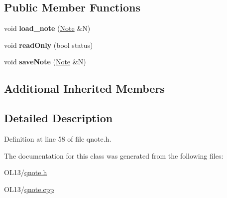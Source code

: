 \subsection*{Public Member Functions}
\begin{DoxyCompactItemize}
\item 
\mbox{\label{class_q_task_a548fc51beaa1dcea345c362782aa11c0}} 
void {\bfseries load\+\_\+note} (\hyperlink{class_note}{Note} \&N)
\item 
\mbox{\label{class_q_task_a1bf9080c14e7a94094bde3fa315d66d9}} 
void {\bfseries read\+Only} (bool status)
\item 
\mbox{\label{class_q_task_ae304b097cdfd1169d2b190bbad3922eb}} 
void {\bfseries save\+Note} (\hyperlink{class_note}{Note} \&N)
\end{DoxyCompactItemize}
\subsection*{Additional Inherited Members}


\subsection{Detailed Description}


Definition at line 58 of file qnote.\+h.



The documentation for this class was generated from the following files\+:\begin{DoxyCompactItemize}
\item 
O\+L13/\hyperlink{qnote_8h}{qnote.\+h}\item 
O\+L13/\hyperlink{qnote_8cpp}{qnote.\+cpp}\end{DoxyCompactItemize}
